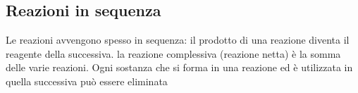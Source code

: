 \documentclass[a4paper,11pt]{report}
\begin{document}
\subsection*{Reazioni in sequenza}
Le reazioni avvengono spesso in sequenza: il prodotto di una reazione diventa il reagente della successiva. la reazione complessiva (reazione netta) è la somma delle varie reazioni. Ogni sostanza che si forma in una reazione ed è utilizzata in quella successiva può essere eliminata
\end{document}
